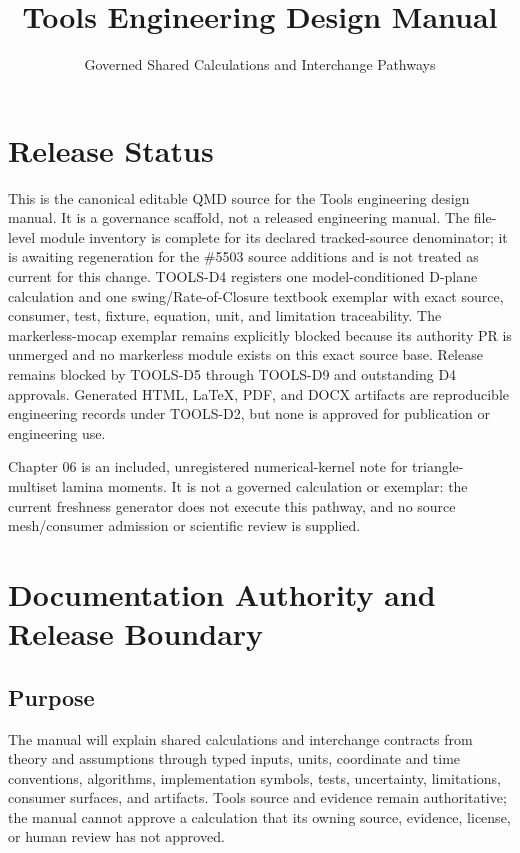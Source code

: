 \documentclass[
  american,
]{article}
\title{Tools Engineering Design Manual}
\subtitle{Governed Shared Calculations and Interchange Pathways}
\author{}
\date{}
\newcounter{none} %
\begin{document}
\maketitle

\section{Release Status}\label{release-status}

This is the canonical editable QMD source for the Tools engineering
design manual. It is a governance scaffold, not a released engineering
manual. The file-level module inventory is complete for its declared
tracked-source denominator; it is awaiting regeneration for the \#5503
source additions and is not treated as current for this change. TOOLS-D4
registers one model-conditioned D-plane calculation and one
swing/Rate-of-Closure textbook exemplar with exact source, consumer,
test, fixture, equation, unit, and limitation traceability. The
markerless-mocap exemplar remains explicitly blocked because its
authority PR is unmerged and no markerless module exists on this exact
source base. Release remains blocked by TOOLS-D5 through TOOLS-D9 and
outstanding D4 approvals. Generated HTML, LaTeX, PDF, and DOCX artifacts
are reproducible engineering records under TOOLS-D2, but none is
approved for publication or engineering use.

Chapter 06 is an included, unregistered numerical-kernel note for
triangle-multiset lamina moments. It is not a governed calculation or
exemplar: the current freshness generator does not execute this pathway,
and no source mesh/consumer admission or scientific review is supplied.

\section{Documentation Authority and Release
Boundary}\label{documentation-authority-and-release-boundary}

\subsection{Purpose}\label{purpose}

The manual will explain shared calculations and interchange contracts
from theory and assumptions through typed inputs, units, coordinate and
time conventions, algorithms, implementation symbols, tests,
uncertainty, limitations, consumer surfaces, and artifacts. Tools source
and evidence remain authoritative; the manual cannot approve a
calculation that its owning source, evidence, license, or human review
has not approved.
\end{document}
